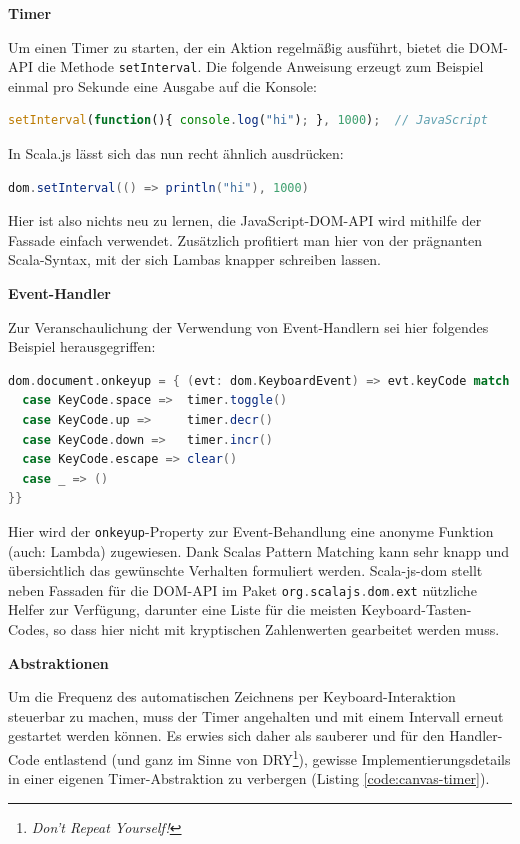 \documentclass[a4paper, 12pt, hidelinks, listof=totoc, listoftables=totoc, bibliography=totoc]{scrreprt}
\newcommand{\scala}[1]{\lstinline[language=Scala, style=inline]|#1|}
\newcommand{\MyMiniSec}[1]{\rmfamily\fontsize{12}{15}\selectfont
	\vspace{7pt}\textbf{#1} %
}
\begin{document}
\MyMiniSec{Timer}

Um einen Timer zu starten, der ein Aktion regelmäßig ausführt, bietet die \ac{DOM}-\ac{API} die Methode \scala{setInterval}. Die folgende Anweisung erzeugt zum Beispiel einmal pro Sekunde eine Ausgabe auf die Konsole:

\begin{lstlisting}[language=JavaScript, style=snippet]
setInterval(function(){ console.log("hi"); }, 1000);  // JavaScript
\end{lstlisting}

In Scala.js lässt sich das nun recht ähnlich ausdrücken:

\begin{lstlisting}[language=Scala, style=snippet]
dom.setInterval(() => println("hi"), 1000)
\end{lstlisting}

Hier ist also nichts neu zu lernen, die JavaScript-\ac{DOM}-\ac{API} wird mithilfe der Fassade einfach verwendet. Zusätzlich profitiert man hier von der prägnanten Scala-Syntax, mit der sich Lambas knapper schreiben lassen.


\MyMiniSec{Event-Handler}

Zur Veranschaulichung der Verwendung von Event-Handlern sei hier folgendes Beispiel herausgegriffen:

\begin{lstlisting}[language=Scala, style=snippet]
dom.document.onkeyup = { (evt: dom.KeyboardEvent) => evt.keyCode match {
  case KeyCode.space =>  timer.toggle()
  case KeyCode.up =>     timer.decr()
  case KeyCode.down =>   timer.incr()
  case KeyCode.escape => clear()
  case _ => ()
}}
\end{lstlisting}

Hier wird der \scala{onkeyup}-Property zur Event-Behandlung eine anonyme Funktion (auch: Lambda) zugewiesen. Dank Scalas Pattern Matching kann sehr knapp und übersichtlich das gewünschte Verhalten formuliert werden. Scala-js-dom stellt neben Fassaden für die \ac{DOM}-\ac{API} im Paket \scala{org.scalajs.dom.ext} nützliche Helfer zur Verfügung, darunter eine Liste für die meisten Keyboard-Tasten-Codes, so dass hier nicht mit kryptischen Zahlenwerten gearbeitet werden muss.


\MyMiniSec{Abstraktionen}

Um die Frequenz des automatischen Zeichnens per Keyboard-Interaktion steuerbar zu machen, muss der Timer angehalten und mit einem Intervall erneut gestartet werden können. Es erwies sich daher als sauberer und für den Handler-Code entlastend (und ganz im Sinne von DRY\footnote{\emph{Don't Repeat Yourself!}}), gewisse Implementierungsdetails in einer eigenen Timer-Abstraktion zu verbergen (Listing \ref{code:canvas-timer}).
\end{document}
